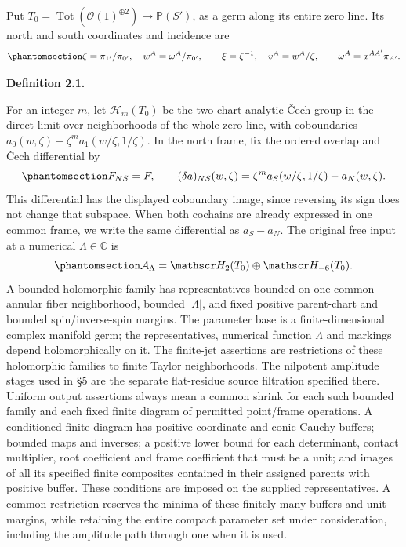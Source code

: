 \documentclass[
  english,
  11pt,
  reqno]{amsart}
\makeatletter
\newcommand{\pandocstatementheading}[1]{%
  \par\addpenalty{\@beginparpenalty}%
  \addvspace{.5\baselineskip plus .2\baselineskip minus .2\baselineskip}%
  {\normalfont\bfseries #1\par}%
  \nobreak\@afterindenttrue\@afterheading
}
\makeatother
\begin{document}
Put \(T_0=\operatorname{Tot}(\mathcal O(1)^{\oplus2})\to\mathbb P(S')\),
as a germ along its entire zero line. Its north and south coordinates
and incidence are
\begin{equation}\protect\phantomsection\label{eq:gg-flat-incidence}{
 \zeta=\pi_{1'}/\pi_{0'},\quad
 w^A=\omega^A/\pi_{0'},\qquad
 \xi=\zeta^{-1},\quad v^A=w^A/\zeta,\qquad
 \omega^A=x^{AA'}\pi_{A'}.
}\end{equation}

\pandocstatementheading{\protect{}\label{def:gg-original-input}Definition 2.1.}

For an integer \(m\), let \(\mathscr H_m(T_0)\) be the two-chart
analytic Čech group in the direct limit over neighborhoods of the whole
zero line, with coboundaries
\(a_0(w,\zeta)-\zeta^m a_1(w/\zeta,1/\zeta)\). In the north frame, fix
the ordered overlap and Čech differential by
\begin{equation}\protect\phantomsection\label{eq:gg-original-cech-orientation}{
 F_{NS}=F,\qquad
 (\delta a)_{NS}(w,\zeta)
   =\zeta^m a_S(w/\zeta,1/\zeta)-a_N(w,\zeta).
}\end{equation} This differential has the displayed coboundary image,
since reversing its sign does not change that subspace. When both
cochains are already expressed in one common frame, we write the same
differential as \(a_S-a_N\). The original free input at a numerical
\(\Lambda\in\mathbb C\) is
\begin{equation}\protect\phantomsection\label{eq:gg-original-input}{
 \mathcal A_\Lambda=\mathscr H_2(T_0)\oplus\mathscr H_{-6}(T_0).
}\end{equation} A bounded holomorphic family has representatives bounded
on one common annular fiber neighborhood, bounded \(|\Lambda|\), and
fixed positive parent-chart and bounded spin/inverse-spin margins. The
parameter base is a finite-dimensional complex manifold germ; the
representatives, numerical function \(\Lambda\) and markings depend
holomorphically on it. The finite-jet assertions are restrictions of
these holomorphic families to finite Taylor neighborhoods. The nilpotent
amplitude stages used in §5 are the separate flat-residue source
filtration specified there. Uniform output assertions always mean a
common shrink for each such bounded family and each fixed finite diagram
of permitted point/frame operations. A conditioned finite diagram has
positive coordinate and conic Cauchy buffers; bounded maps and inverses;
a positive lower bound for each determinant, contact multiplier, root
coefficient and frame coefficient that must be a unit; and images of all
its specified finite composites contained in their assigned parents with
positive buffer. These conditions are imposed on the supplied
representatives. A common restriction reserves the minima of these
finitely many buffers and unit margins, while retaining the entire
compact parameter set under consideration, including the amplitude path
through one when it is used.
\end{document}
